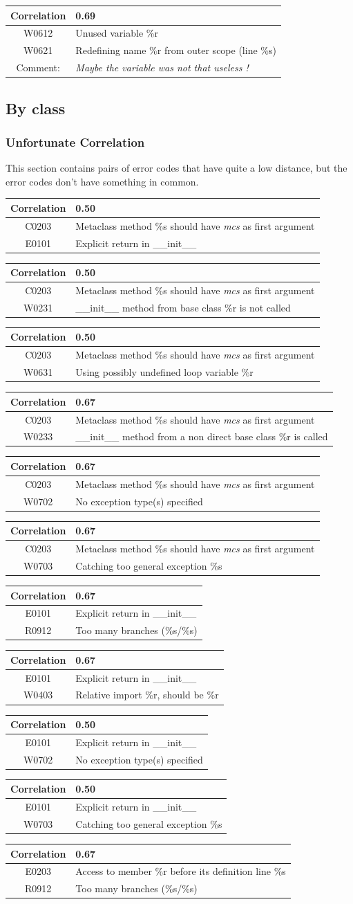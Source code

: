 \documentclass[12pt, a4paper]{article}
\newcommand{\tbf}[1]{\textbf{#1}}
\newcommand{\tit}[1]{\textit{#1}}
\newcommand{\noi}{\noindent}
\newcommand{\Cztwzth}{Metaclass method \%s should have \tit{mcs} as first argument}
\newcommand{\Ezozo}{Explicit return in \_\_init\_\_}
\newcommand{\Eztwzth}{Access to member \%r before its definition line \%s}
\newcommand{\Rznotw}{Too many branches (\%s/\%s)}
\newcommand{\Wztwtho}{\_\_init\_\_ method from base class \%r is not called}
\newcommand{\Wztwthth}{\_\_init\_\_ method from a non direct base class \%r is called}
\newcommand{\Wzfzth}{Relative import \%r, should be \%r}
\newcommand{\Wzstho}{Using possibly undefined loop variable \%r}
\newcommand{\Wzseztw}{No exception type(s) specified}
\newcommand{\Wzsezth}{Catching too general exception \%s}
\newcommand{\mytab}[5]{
	\begin{tabularx}{\textwidth}{|c|X|}
	\hline
	\tbf{Correlation}		& #1 \\
	\hline
	#2	& #3 \\
	\hline
	#4	& #5 \\
	\hline
	\end{tabularx}
}
\begin{document}
\bigskip \noi
\begin{tabularx}{\textwidth}{|c|X|}
\hline
\tbf{Correlation}   & 0.69 \\
\hline
W0612   & Unused variable \%r \\
\hline
W0621   & Redefining name \%r from outer scope (line \%s) \\
\hline
Comment: & \textit{Maybe the variable was not that useless !}\\
\hline
\end{tabularx}



\bigskip
\subsection{By class}

\subsubsection*{Unfortunate Correlation}
This section contains pairs of error codes that have quite a low distance, but the error codes don't have something in common.

\bigskip \noi
\mytab{0.50}{C0203}{\Cztwzth{}}{E0101}{\Ezozo{}}

\bigskip \noi
\mytab{0.50}{C0203}{\Cztwzth{}}{W0231}{\Wztwtho{}}

\bigskip \noi
\mytab{0.50}{C0203}{\Cztwzth{}}{W0631}{\Wzstho{}}

\bigskip \noi
\begin{tabularx}{\textwidth}{|c|X|}
\hline
\tbf{Correlation}   & 0.67 \\
\hline
C0203   & \Cztwzth{} \\
\hline
W0233   & \Wztwthth{} \\
\hline
\end{tabularx}

\bigskip \noi
\mytab{0.67}{C0203}{\Cztwzth{}}{W0702}{\Wzseztw{}}

\bigskip \noi
\mytab{0.67}{C0203}{\Cztwzth{}}{W0703}{\Wzsezth{}}

\bigskip \noi
\mytab{0.67}{E0101}{\Ezozo{}}{R0912}{\Rznotw{}}

\bigskip \noi
\mytab{0.67}{E0101}{\Ezozo{}}{W0403}{\Wzfzth{}}

\bigskip \noi
\mytab{0.50}{E0101}{\Ezozo{}}{W0702}{\Wzseztw{}}

\bigskip \noi
\mytab{0.50}{E0101}{\Ezozo{}}{W0703}{\Wzsezth{}}

\bigskip \noi
\mytab{0.67}{E0203}{\Eztwzth{}}{R0912}{\Rznotw{}}
\end{document}
